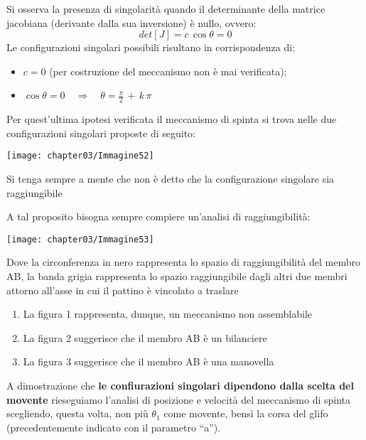 		Si osserva la presenza di singolarità quando il determinante della matrice jacobiana (derivante dalla sua inversione) è nullo, ovvero:
		\begin{equation*}
			det[J] = c\,\cos{\theta} = 0
		\end{equation*}
		Le configurazioni singolari possibili risultano in corrispondenza di:

		\begin{itemize}
			\item $c = 0$ (per costruzione del meccanismo non è mai verificata);
			\item $\cos{\theta} = 0\quad\Rightarrow\quad \theta = \frac{\pi}{2}\,+\,k\,\pi$
		\end{itemize}
	
		Per quest'ultima ipotesi verificata il meccanismo di spinta si trova nelle due configurazioni singolari proposte di seguito:
		
		\begin{center}
		\texttt{[image: chapter03/Immagine52]}
		\end{center}
		
	\vspace{1mm}
		
		Si tenga sempre a mente che non è detto che la configurazione singolare sia raggiungibile

		A tal proposito bisogna sempre compiere un'analisi di raggiungibilità:
		
	\begin{center}
	\texttt{[image: chapter03/Immagine53]}
	\end{center}	
	
	Dove la circonferenza in nero rappresenta lo spazio di raggiungibilità del membro AB, la banda grigia rappresenta lo spazio raggiungibile dagli altri due membri attorno all'asse in cui il pattino è vincolato a traslare
		
		\begin{enumerate}[$\rightarrow$]
			\item La figura 1 rappresenta, dunque, un meccanismo non assemblabile
			\item La figura 2 suggerisce che il membro AB è un bilanciere
			\item La figura 3 suggerisce che il membro AB è una manovella
		\end{enumerate}
		
			A dimostrazione che \textbf{le confiurazioni singolari dipendono dalla scelta del movente} rieseguiamo l'analisi di posizione e velocità del meccanismo di spinta scegliendo, questa volta, non più $\theta_1$ come movente, bensì la corsa del glifo (precedentemente indicato con il parametro ``a'').
	
